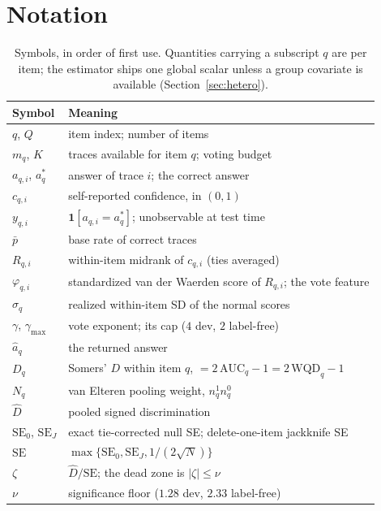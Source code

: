 \documentclass[twoside,11pt]{article}
\newcommand{\Dhat}{\widehat{D}}
\begin{document}
\section{Notation}\label{app:notation}
\begingroup
\setlength{\tabcolsep}{4pt}
\renewcommand{\arraystretch}{1.12}
\begin{table}[h]
\centering
\caption{Symbols, in order of first use. Quantities carrying a subscript $q$
are per item; the estimator ships one global scalar unless a group covariate is
available (Section~\ref{sec:hetero}).}
\label{tab:notation}
\footnotesize
\begin{tabular}{@{}l p{5.55cm}@{}}
\toprule
Symbol & Meaning \\
\midrule
$q$, $Q$ & item index; number of items \\
$m_q$, $K$ & traces available for item $q$; voting budget \\
$a_{q,i}$, $a^\ast_q$ & answer of trace $i$; the correct answer \\
$c_{q,i}$ & self-reported confidence, in $(0,1)$ \\
$y_{q,i}$ & $\mathbf{1}[a_{q,i}=a^\ast_q]$; unobservable at test time \\
$\bar p$ & base rate of correct traces \\
\midrule
$R_{q,i}$ & within-item midrank of $c_{q,i}$ (ties averaged) \\
$\varphi_{q,i}$ & standardized van der Waerden score of $R_{q,i}$; the vote feature \\
$\sigma_q$ & realized within-item SD of the normal scores \\
$\gamma$, $\gamma_{\max}$ & vote exponent; its cap ($4$ dev, $2$ label-free) \\
$\hat a_q$ & the returned answer \\
\midrule
$D_q$ & Somers' $D$ within item $q$, $=2\,\mathrm{AUC}_q-1=2\,\mathrm{WQD}_q-1$ \\
$N_q$ & van Elteren pooling weight, $n^1_qn^0_q$ \\
$\Dhat$ & pooled signed discrimination \\
$\mathrm{SE}_0$, $\mathrm{SE}_J$ & exact tie-corrected null SE; delete-one-item jackknife SE \\
$\mathrm{SE}$ & $\max\{\mathrm{SE}_0,\mathrm{SE}_J,1/(2\sqrt N)\}$ \\
$\zeta$ & $\Dhat/\mathrm{SE}$; the dead zone is $|\zeta|\le\nu$ \\
$\nu$ & significance floor ($1.28$ dev, $2.33$ label-free) \\

\end{tabular}
\end{table}
\end{document}
